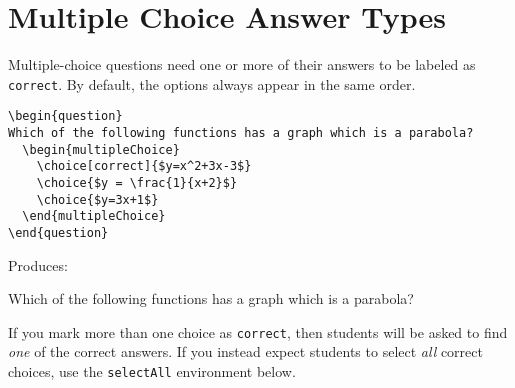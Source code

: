 \documentclass{ximera}
\begin{document}
\section{Multiple Choice Answer Types} \label{MCAnswerType}

\begin{example}
Multiple-choice questions need one or more of their answers to be labeled as \verb!correct!. By default, the options always appear in the same order.

\begin{verbatim}
\begin{question}
Which of the following functions has a graph which is a parabola?
  \begin{multipleChoice}
    \choice[correct]{$y=x^2+3x-3$}
    \choice{$y = \frac{1}{x+2}$}
    \choice{$y=3x+1$}
  \end{multipleChoice}
\end{question}
\end{verbatim}

Produces:

\begin{question}
  Which of the following functions has a graph which is a parabola?
  \begin{multipleChoice}
  \end{multipleChoice}
\end{question}

\begin{remark}
If you mark more than one choice as \verb!correct!, then students will be asked to find \emph{one} of the correct answers. If you instead expect students to select \emph{all} correct choices, use the \verb!selectAll! environment below.
\end{remark}

\end{example}
\end{document}
